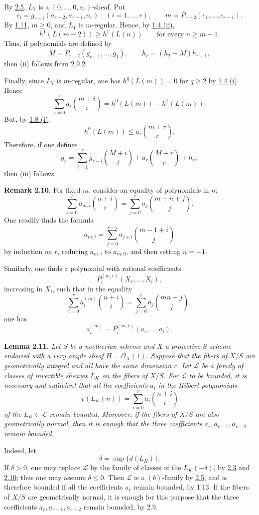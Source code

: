By \hyperlink{sga6.e13.lem.2-5}{2.5}, \(L_Y\) is a \((0,\ldots,0,a_r)\)-sheaf. Put
\[
c_i=g_{r-i}(a_{r-2},a_{r-1},a_r)
\quad(i=1,\ldots,r),
\qquad
m=P_{r-2}(c_1,\ldots,c_{r-1}).
\]
By \hyperlink{sga6.e13.thm.1-11}{1.11}, \(m\ge0\), and \(L_Y\) is \(m\)-regular. Hence, by \hyperlink{sga6.e13.prop.1-4}{1.4 (ii)},
\[
h^1(L(m-2))\ge h^1(L(n))
\qquad\text{for every }n\ge m-1.
\]
Thus, if polynomials are defined by
\[
M=P_{r-2}(g_{r-1},\ldots,g_1),
\qquad
h_r=(h_2+M)h_{r-1},
\]
then (ii) follows from 2.9.2.

Finally, since \(L_Y\) is \(m\)-regular, one has \(h^q(L(m))=0\) for
\(q\ge2\) by \hyperlink{sga6.e13.prop.1-4}{1.4 (i)}. Hence
\[
\sum_{i=0}^{r}a_i\binom{m+i}{i}
=h^0(L(m))-h^1(L(m)).
\]
But, by \hyperlink{sga6.e13.prop.1-8}{1.8 (i)},
\[
h^0(L(m))\le a_r\binom{m+r}{r}.
\]
Therefore, if one defines
\[
g_r=
\sum_{i=1}^{r}g_{r-i}\binom{M+i}{i}
+a_r\binom{M+r}{r}+h_r,
\]
then (iii) follows.

\textbf{Remark 2.10.} For fixed \(m\), consider an equality of
polynomials in \(n\):
\[
\sum_{i=0}^{r}a_{m,i}\binom{n+i}{i}
=\sum_{j=0}^{r}a_j\binom{m+n+j}{j}.
\]
One readily finds the formula
\[
a_{m,i}=
\sum_{j=0}^{r-i}a_{j+i}\binom{m-1+i}{j}
\]
by induction on \(r\), reducing \(a_{m,i}\) to \(a_{m,0}\), and then
setting \(n=-1\).

Similarly, one finds a polynomial with rational coefficients
\[
P_i^{(m,r)}(X_r,\ldots,X_i),
\]
increasing in \(X_i\), such that in the equality
\[
\sum_{i=0}^{r}a_i^{(m)}\binom{n+i}{i}
=\sum_{j=0}^{r}a_j\binom{mn+j}{j},
\]
one has
\[
a_i^{(m)}=P_i^{(m,r)}(a_r,\ldots,a_i).
\]

\textbf{Lemma 2.11.} \emph{Let \(S\) be a noetherian scheme and \(X\)
a projective \(S\)-scheme endowed with a very ample sheaf
\(H=\mathcal O_X(1)\). Suppose that the fibers of \(X/S\) are
geometrically integral and all have the same dimension \(r\). Let
\(\mathcal L\) be a family of classes of invertible sheaves \(L_K\) on the
fibers of \(X/S\). For \(\mathcal L\) to be bounded, it is necessary and
sufficient that all the coefficients \(a_i\) in the Hilbert polynomials}
\[
\chi(L_K(n))=\sum_{i=0}^{r}a_i\binom{n+i}{i}
\]
\emph{of the \(L_K\in\mathcal L\) remain bounded. Moreover, if the
fibers of \(X/S\) are also geometrically normal, then it is enough that
the three coefficients \(a_r,a_{r-1},a_{r-2}\) remain bounded.}

Indeed, let
\[
\delta=\sup\{d(L_K)\}.
\]
If \(\delta>0\), one may replace \(\mathcal L\) by the family of classes
of the \(L_K(-\delta)\), by \hyperlink{sga6.e13.lem.2-3}{2.3} and \hyperlink{sga6.e13.rem.2-10}{2.10}; thus one may assume
\(\delta\le0\). Then \(\mathcal L\) is a \((b)\)-family by \hyperlink{sga6.e13.lem.2-5}{2.5}, and is
therefore bounded if all the coefficients \(a_i\) remain bounded, by
1.13. If the fibers of \(X/S\) are geometrically normal, it is enough
for this purpose that the three coefficients \(a_r,a_{r-1},a_{r-2}\)
remain bounded, by 2.9.

